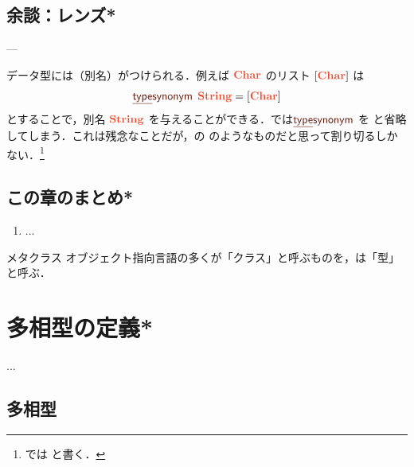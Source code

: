 \documentclass[a5paper,twoside,fleqn,draft]{jsbook}
\begin{document}
\section{余談：レンズ*}



---


データ型には（別名）がつけられる．例えば $\mCharType$ のリスト $[\mCharType]$ は
\begin{equation}
  \mTypeSynonymDecl\;
  \mStringType
  =[\mCharType]
\end{equation}
とすることで，別名 $\mStringType$ を与えることができる．\haskell では$\mTypeSynonymDecl$ を  と省略してしまう．これは残念なことだが，\clang の  のようなものだと思って割り切るしかない．\footnote{\haskell では  と書く．}

\section{この章のまとめ*}

\begin{enumerate}
\item ...
\end{enumerate}

\begin{note}{メタクラス}
オブジェクト指向言語の多くが「クラス」と呼ぶものを，\haskell は「型」と呼ぶ．


\end{note}


\chapter{多相型の定義*}
\label{ch:polymorphic-data-type}
...

\section{多相型}
\end{document}
